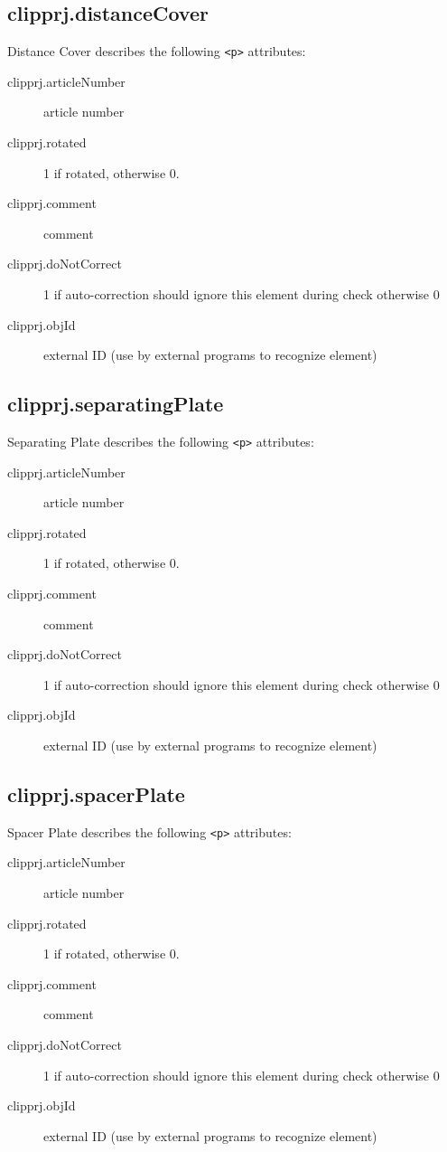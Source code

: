 \documentclass[%
	a4paper,
	oneside,
	listof=numbered,
	parskip=half,
	headsepline=true,
	footsepline=false,
	normalheadings,
	0.7headlines,
	headexclude,
	]{scrbook}
\begin{document}
\subsection{clipprj.distanceCover}
 
Distance Cover describes the following \verb|<p>| attributes: 

\begin{description}
	\item[clipprj.articleNumber] article number 
	\item[clipprj.rotated] 1 if rotated, otherwise 0. 
	\item[clipprj.comment] comment 
	\item[clipprj.doNotCorrect] 1 if auto-correction should ignore this element during check otherwise 0 
	\item[clipprj.objId] external ID (use by external programs to recognize element) 
\end{description}

\subsection{clipprj.separatingPlate}
 
Separating Plate describes the following \verb|<p>| attributes: 

\begin{description}
	\item[clipprj.articleNumber] article number 
	\item[clipprj.rotated] 1 if rotated, otherwise 0. 
	\item[clipprj.comment] comment 
	\item[clipprj.doNotCorrect] 1 if auto-correction should ignore this element during check otherwise 0 
	\item[clipprj.objId] external ID (use by external programs to recognize element) 
\end{description}

\subsection{clipprj.spacerPlate}
 
Spacer Plate describes the following \verb|<p>| attributes: 

\begin{description}
	\item[clipprj.articleNumber] article number 
	\item[clipprj.rotated] 1 if rotated, otherwise 0. 
	\item[clipprj.comment] comment 
	\item[clipprj.doNotCorrect] 1 if auto-correction should ignore this element during check otherwise 0 
	\item[clipprj.objId] external ID (use by external programs to recognize element) 
\end{description}
\end{document}
